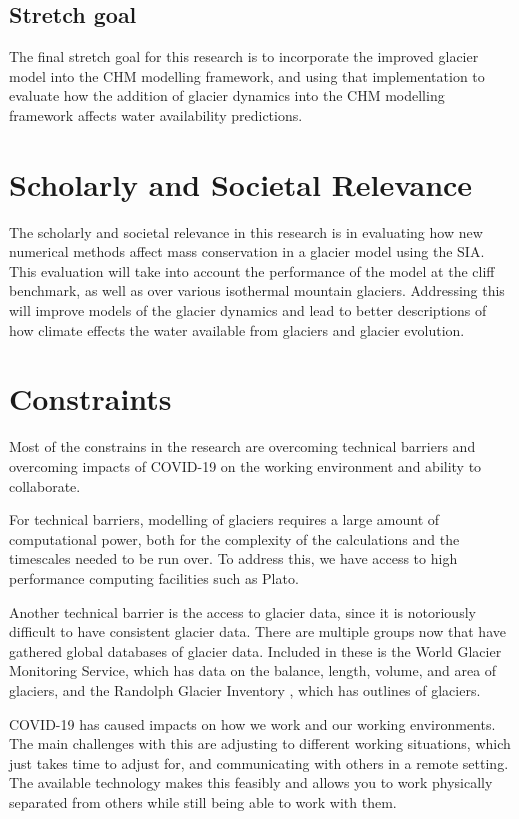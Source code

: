 \documentclass{article}
\begin{document}
\subsection{Stretch goal}
The final stretch goal for this research is to incorporate the improved glacier model into the CHM modelling framework, and using that implementation to evaluate how the addition of glacier dynamics into the CHM modelling framework affects water availability predictions. 


\section{Scholarly and Societal Relevance}
The scholarly and societal relevance in this research is in evaluating how new numerical methods affect mass conservation in a glacier model using the SIA. This evaluation will take into account the performance of the model at the cliff benchmark, as well as over various isothermal mountain glaciers. Addressing this will improve models of the glacier dynamics and lead to better descriptions of how climate effects the water available from glaciers and glacier evolution. 

\section{Constraints}
Most of the constrains in the research are overcoming technical barriers and overcoming impacts of COVID-19 on the working environment and ability to collaborate.

For technical barriers, modelling of glaciers requires a large amount of computational power, both for the complexity of the calculations and the timescales needed to be run over. To address this, we have access to high performance computing facilities such as Plato.  

Another technical barrier is the access to glacier data, since it is notoriously difficult to have consistent glacier data. There are multiple groups now that have gathered global databases of glacier data. Included in these is the World Glacier Monitoring Service, which has data on the balance, length, volume, and area of glaciers, and the Randolph Glacier Inventory \citep{RGI2017}, which has outlines of glaciers.

COVID-19 has caused impacts on how we work and our working environments. The main challenges with this are adjusting to different working situations, which just takes time to adjust for, and communicating with others in a remote setting. The available technology makes this feasibly and allows you to work physically separated from others while still being able to work with them.
\end{document}
